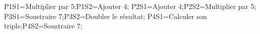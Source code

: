 \documentclass[exercice]{thedocument}%
\begin{document}
%
    \>P1S1=Multiplier par 5;\>P1S2=Ajouter 4;%
    \>P2S1=Ajouter 4;\>P2S2=Multiplier par 5;%
    \>P3S1=Soustraire 7;\>P3S2=Doubler le résultat;%
    \>P4S1=Calculer son triple;\>P4S2=Soustraire 7;%
\end{document}
